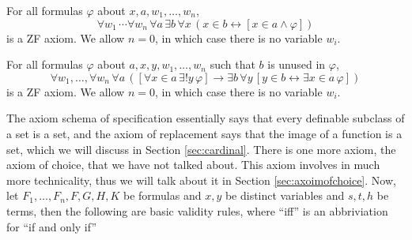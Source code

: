 \documentclass[11pt]{book}
\begin{document}
\begin{axiom}For all formulas $\varphi$ about $x, a,w_{1}, \ldots, w_{n}$,
\[\forall w_{1}\, \cdots\forall w_{n}\, \forall a\, \exists b \,\forall x\,\left(x \in b \leftrightarrow\left[x \in a \wedge \varphi\right]\right)\]
is a ZF axiom. We allow $n=0$, in which case there is no variable $w_i$.
\end{axiom}
\begin{axiom}For all formulas $\varphi$ about $a,x, y,w_{1}, \ldots, w_{n}$ such that $b$ is unused in $\varphi$,
\[\forall w_{1}, \ldots,\forall w_{n}\, \forall a\,\left(\left[\forall x \in a\, \exists! y \,\varphi\right] \rightarrow \exists b\, \forall y\,\left[y \in b \leftrightarrow \exists x \in a\, \varphi\right]\right)\]
is a ZF axiom. We allow $n=0$, in which case there is no variable $w_i$.
\end{axiom}\newpage
The axiom schema of specification essentially says that every definable subclass of a set is a set, and the axiom of replacement says that the image of a function is a set, which we will discuss in Section \ref{sec:cardinal}. There is one more axiom, the axiom of choice, that we have not talked about. This axiom involves in much more technicality, thus we will talk about it in Section \ref{sec:axoimofchoice}. Now, let $F_1,\dots,F_n,F,G,H,K$ be formulas and $x,y$ be distinct variables and $s,t,h$ be terms, then the following are basic validity rules, where ``iff'' is an abbriviation for ``if and only if''
\end{document}
